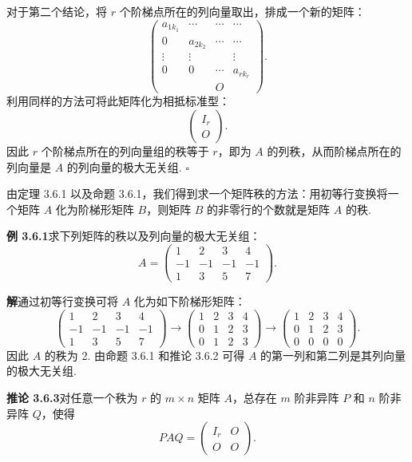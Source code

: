 \documentclass[UTF8,12pt,a4paper,fontset=fandol]{ctexart}
\begin{document}
对于第二个结论，将 $r$ 个阶梯点所在的列向量取出，排成一个新的矩阵：
\[
\left(\begin{array}{cccc}
a_{1k_1}&\cdots&\cdots&\cdots\\
0&a_{2k_2}&\cdots&\cdots\\
\vdots&\vdots&&\vdots\\
0&0&\cdots&a_{rk_r}\\
&&O&
\end{array}\right).
\]
利用同样的方法可将此矩阵化为相抵标准型：
\[
\left(\begin{array}{c}
I_r\\
O
\end{array}\right).
\]
因此 $r$ 个阶梯点所在的列向量组的秩等于 $r$，即为 $A$ 的列秩，从而阶梯点所在的列向量是 $A$ 的列向量的极大无关组. $\square$

由定理 3.6.1 以及命题 3.6.1，我们得到求一个矩阵秩的方法：用初等行变换将一个矩阵 $A$ 化为阶梯形矩阵 $B$，则矩阵 $B$ 的非零行的个数就是矩阵 $A$ 的秩.

\noindent\textbf{例 3.6.1}\quad 求下列矩阵的秩以及列向量的极大无关组：
\[
A=\left(\begin{array}{rrrr}
1&2&3&4\\
-1&-1&-1&-1\\
1&3&5&7
\end{array}\right).
\]

\noindent\textbf{解}\quad 通过初等行变换可将 $A$ 化为如下阶梯形矩阵：
\[
\left(\begin{array}{rrrr}
1&2&3&4\\
-1&-1&-1&-1\\
1&3&5&7
\end{array}\right)
\to
\left(\begin{array}{rrrr}
1&2&3&4\\
0&1&2&3\\
0&1&2&3
\end{array}\right)
\to
\left(\begin{array}{rrrr}
1&2&3&4\\
0&1&2&3\\
0&0&0&0
\end{array}\right).
\]
因此 $A$ 的秩为 2. 由命题 3.6.1 和推论 3.6.2 可得 $A$ 的第一列和第二列是其列向量的极大无关组.

\noindent\textbf{推论 3.6.3}\quad 对任意一个秩为 $r$ 的 $m\times n$ 矩阵 $A$，总存在 $m$ 阶非异阵 $P$ 和 $n$ 阶非异阵 $Q$，使得
\begin{equation}
PAQ=\left(\begin{array}{cc}
I_r&O\\
O&O
\end{array}\right).
\tag{3.6.1}
\end{equation}
\end{document}
